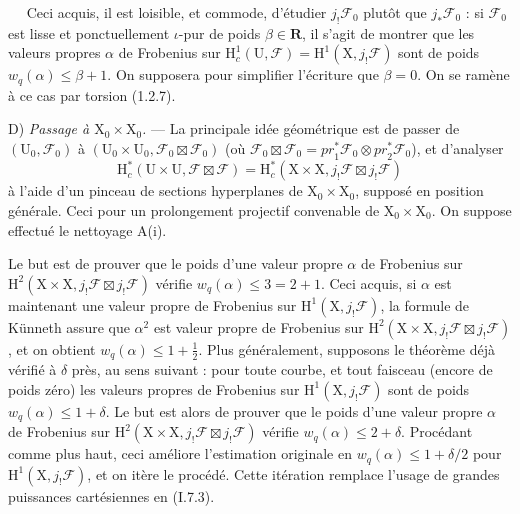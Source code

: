 \documentclass[11pt,leqno]{article}
\newcommand{\Page}[1]{\ifvmode\noindent\else\unskip\ \fi{\footnotesize\textcolor{gray}{[p.\,#1]}}\ \ignorespaces}
\begin{document}
\Page{140}
Ceci acquis, il est loisible, et commode, d’étudier \(j_!\mathscr{F}_0\) plutôt que \(j_*\mathscr{F}_0\) : si \(\mathscr{F}_0\) est lisse et ponctuellement \(\iota\)-pur de poids \(\beta\in\mathbf{R}\), il s’agit de montrer que les valeurs propres \(\alpha\) de Frobenius sur \(\mathrm{H}_c^1(\mathrm{U},\mathscr{F})=\mathrm{H}^1(\mathrm{X},j_!\mathscr{F})\) sont de poids \(w_q(\alpha)\leq\beta+1\). On supposera pour simplifier l’écriture que \(\beta=0\). On se ramène à ce cas par torsion (1.2.7).

D) \textit{Passage à \(\mathrm{X}_0\times\mathrm{X}_0\).} — La principale idée géométrique est de passer de \((\mathrm{U}_0,\mathscr{F}_0)\) à \((\mathrm{U}_0\times\mathrm{U}_0,\mathscr{F}_0\boxtimes\mathscr{F}_0)\) (où \(\mathscr{F}_0\boxtimes\mathscr{F}_0=\mathit{pr}_1^*\mathscr{F}_0\otimes\mathit{pr}_2^*\mathscr{F}_0\)), et d’analyser
\[
\mathrm{H}_c^*(\mathrm{U}\times\mathrm{U},\mathscr{F}\boxtimes\mathscr{F})
=
\mathrm{H}_c^*(\mathrm{X}\times\mathrm{X},j_!\mathscr{F}\boxtimes j_!\mathscr{F})
\]
à l’aide d’un pinceau de sections hyperplanes de \(\mathrm{X}_0\times\mathrm{X}_0\), supposé en position générale. Ceci pour un prolongement projectif convenable de \(\mathrm{X}_0\times\mathrm{X}_0\). On suppose effectué le nettoyage A(i).

Le but est de prouver que le poids d’une valeur propre \(\alpha\) de Frobenius sur \(\mathrm{H}^2(\mathrm{X}\times\mathrm{X},j_!\mathscr{F}\boxtimes j_!\mathscr{F})\) vérifie \(w_q(\alpha)\leq 3=2+1\). Ceci acquis, si \(\alpha\) est maintenant une valeur propre de Frobenius sur \(\mathrm{H}^1(\mathrm{X},j_!\mathscr{F})\), la formule de Künneth assure que \(\alpha^2\) est valeur propre de Frobenius sur \(\mathrm{H}^2(\mathrm{X}\times\mathrm{X},j_!\mathscr{F}\boxtimes j_!\mathscr{F})\), et on obtient \(w_q(\alpha)\leq 1+\frac{1}{2}\). Plus généralement, supposons le théorème déjà vérifié à \(\delta\) près, au sens suivant : pour toute courbe, et tout faisceau (encore de poids zéro) les valeurs propres de Frobenius sur \(\mathrm{H}^1(\mathrm{X},j_!\mathscr{F})\) sont de poids \(w_q(\alpha)\leq 1+\delta\). Le but est alors de prouver que le poids d’une valeur propre \(\alpha\) de Frobenius sur \(\mathrm{H}^2(\mathrm{X}\times\mathrm{X},j_!\mathscr{F}\boxtimes j_!\mathscr{F})\) vérifie \(w_q(\alpha)\leq 2+\delta\). Procédant comme plus haut, ceci améliore l’estimation originale en \(w_q(\alpha)\leq 1+\delta/2\) pour \(\mathrm{H}^1(\mathrm{X},j_!\mathscr{F})\), et on itère le procédé. Cette itération remplace l’usage de grandes puissances cartésiennes en (I.7.3).
\end{document}
